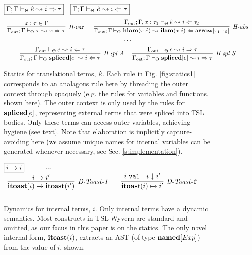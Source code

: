 \begin{figure}[t]
$\fbox{$\Gamma; \Gamma \vdash_\Theta \hat{e} \leadsto i \Rightarrow \tau$}$~
$\fbox{$\Gamma; \Gamma \vdash_\Theta \hat{e} \leadsto i \Leftarrow \tau$}$
\[
\begin{array}{c}
\infer[\textit{H-var}]
	{\Gout; \Gin \vdash_\Theta x \leadsto x \Rightarrow\tau } 
	{x:\tau \in \Gin }
~~~~~
\infer[\textit{H-abs}]
	{\Gout; \Gin \vdash_\Theta  \keyw{hlam}(x . \ih) \leadsto \keyw{ilam}(x.i) \Leftarrow \keyw{arrow}[\tau_1,  \tau_2] } 
	{\Gout; \Gin, x:\tau_1 \vdash_\Theta \ih\leadsto i\Leftarrow \tau_2 }\\[1ex]
\cdots\\[1ex]
\infer[\textit{H-spl-A}]
	{\Gout; \Gin \vdash_\Theta \keyw{spliced}[e] \leadsto i \Leftarrow \tau}
	{\Gout \vdash_\Theta e \leadsto i \Leftarrow \tau}~~~~

\infer[\textit{H-spl-S}]
	{\Gout; \Gin \vdash_\Theta \keyw{spliced}[e] \leadsto i \Rightarrow \tau}
	{\Gout \vdash_\Theta e \leadsto i \Rightarrow \tau}
\end{array}
\]
\caption{Statics for translational terms, $\hat{e}$. Each rule in Fig. \ref{fig:statics1} corresponds to an analagous rule here by threading the outer context through opaquely (e.g. the rules for variables and functions, shown here). The outer context is only used by the rules for $\textbf{spliced}[e]$, representing external terms that were spliced into TSL bodies. Only these terms can access outer variables, achieving hygiene (see text). Note that elaboration is implicitly capture-avoiding here (we assume unique names for internal variables can be generated whenever necessary, see Sec. \ref{s:implementation}).}
\label{fig:staticsHat}
\end{figure}
\begin{figure}[t]
$\fbox{$i \xmapsto{} i$}$~~~~~~$\cdots$~~~~$\begin{array}{c}
\infer[\textit{D-Toast-1}]
	{\keyw{itoast}(i) \xmapsto{} \keyw{itoast}(i') } 
	{i \xmapsto{} i'}
~~~~~~
\infer[\textit{D-Toast-2}]
	{\keyw{itoast}(i)  \xmapsto{} i' } 
	{i\ \texttt{val} & i \downarrow i' }\\[2ex]
\end{array}
$
\caption{Dynamics for internal terms, $i$. Only internal terms have a dynamic semantics. Most constructs in TSL Wyvern are standard and omitted, as our focus in this paper is on the statics. The only novel internal form, $\textbf{itoast}(i)$, extracts an AST (of type $\textbf{named}[Exp]$) from the value of $i$, shown.}
\label{fig:dynsemantics}
\end{figure}
